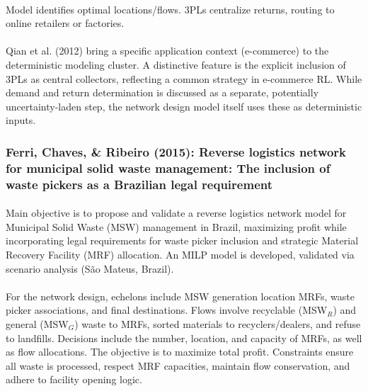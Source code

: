 \paragraph{} Model identifies optimal locations/flows. 3PLs centralize returns, routing to online retailers or factories.

\paragraph{} Qian et al. (2012) bring a specific application context (e-commerce) to the deterministic modeling cluster. A distinctive feature is the explicit inclusion of 3PLs as central collectors, reflecting a common strategy in e-commerce RL. While demand and return determination is discussed as a separate, potentially uncertainty-laden step, the network design model itself uses these as deterministic inputs.

\subsubsection{Ferri, Chaves, \& Ribeiro (2015): Reverse logistics network for municipal solid waste management: The inclusion of waste pickers as a Brazilian legal requirement}

\paragraph{} Main objective is to propose and validate a reverse logistics network model for Municipal Solid Waste (MSW) management in Brazil, maximizing profit while incorporating legal requirements for waste picker inclusion and strategic Material Recovery Facility (MRF) allocation. An MILP model is developed, validated via scenario analysis (São Mateus, Brazil).

\paragraph{} For the network design, echelons include MSW generation location MRFs, waste picker associations, and final destinations. Flows involve recyclable (MSW$_{R}$) and general (MSW$_{G}$) waste to MRFs, sorted materials to recyclers/dealers, and refuse to landfills. Decisions include the number, location, and capacity of MRFs, as well as flow allocations. The objective is to maximize total profit. Constraints ensure all waste is processed, respect MRF capacities, maintain flow conservation, and adhere to facility opening logic.

